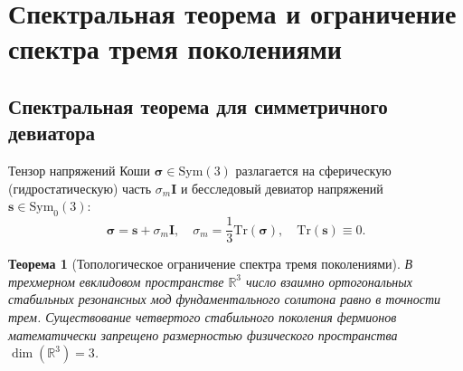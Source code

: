 \documentclass[12pt,a4paper]{article}
\newtheorem{theorem}{Теорема}
\begin{document}
	\section{Спектральная теорема и ограничение спектра тремя поколениями}
	
	\subsection{Спектральная теорема для симметричного девиатора}
	Тензор напряжений Коши $\boldsymbol{\sigma} \in \mathrm{Sym}(3)$ разлагается на сферическую (гидростатическую) часть $\sigma_m \mathbf{I}$ и бесследовый девиатор напряжений $\mathbf{s} \in \mathrm{Sym}_0(3)$:
	\begin{equation}
		\boldsymbol{\sigma} = \mathbf{s} + \sigma_m \mathbf{I}, \quad \sigma_m = \frac{1}{3}\mathrm{Tr}(\boldsymbol{\sigma}), \quad \mathrm{Tr}(\mathbf{s}) \equiv 0.
	\end{equation}
	
	\begin{theorem}[Топологическое ограничение спектра тремя поколениями]
		В трехмерном евклидовом пространстве $\mathbb{R}^3$ число взаимно ортогональных стабильных резонансных мод фундаментального солитона равно в точности трем. Существование четвертого стабильного поколения фермионов математически запрещено размерностью физического пространства $\dim(\mathbb{R}^3) = 3$.
	\end{theorem}
	
\end{document}
